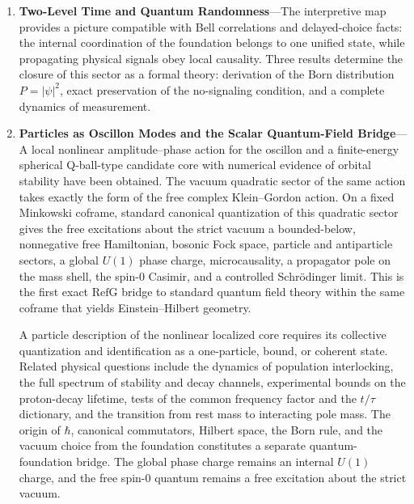 \documentclass[11pt,a4paper]{article}
\newcommand{\RefG}{\mathrm{RefG}}
\begin{document}
\begin{enumerate}[label=\arabic*.]
The complete microphysical bridge for the cosmological sector comprises the nodal-oscillon origin of $\rho_C(n_{C,{\rm op}})$, its relation to $n_{C,F}$ and $P_F$, the normalization of $\Omega_{C0}$ and its connection to the derived cosmological--galactic relation $a_0^{\rm (RefG)} = \frac{3}{5\pi}c_0 H_0$, the foundation origin of local atomic/QED ratios, the microscopic coframe--phase split, particle sources, concrete inhomogeneous solutions, the numerical value of $\Lambda$, Genesis matching, and a complete data model.

\item \textbf{Two-Level Time and Quantum Randomness}---The interpretive map provides a picture compatible with Bell correlations and delayed-choice facts: the internal coordination of the foundation belongs to one unified state, while propagating physical signals obey local causality. Three results determine the closure of this sector as a formal theory: derivation of the Born distribution $P=|\psi|^2$, exact preservation of the no-signaling condition, and a complete dynamics of measurement.

\item \textbf{Particles as Oscillon Modes and the Scalar Quantum-Field Bridge}---A local nonlinear amplitude--phase action for the oscillon and a finite-energy spherical Q-ball-type candidate core with numerical evidence of orbital stability have been obtained. The vacuum quadratic sector of the same action takes exactly the form of the free complex Klein--Gordon action. On a fixed Minkowski coframe, standard canonical quantization of this quadratic sector gives the free excitations about the strict vacuum a bounded-below, nonnegative free Hamiltonian, bosonic Fock space, particle and antiparticle sectors, a global $U(1)$ phase charge, microcausality, a propagator pole on the mass shell, the spin-$0$ Casimir, and a controlled Schrödinger limit. This is the first exact $\RefG$ bridge to standard quantum field theory within the same coframe that yields Einstein--Hilbert geometry.

A particle description of the nonlinear localized core requires its collective quantization and identification as a one-particle, bound, or coherent state. Related physical questions include the dynamics of population interlocking, the full spectrum of stability and decay channels, experimental bounds on the proton-decay lifetime, tests of the common frequency factor and the $t/\tau$ dictionary, and the transition from rest mass to interacting pole mass. The origin of $\hbar$, canonical commutators, Hilbert space, the Born rule, and the vacuum choice from the foundation constitutes a separate quantum-foundation bridge. The global phase charge remains an internal $U(1)$ charge, and the free spin-$0$ quantum remains a free excitation about the strict vacuum.


\end{enumerate}
\end{document}
